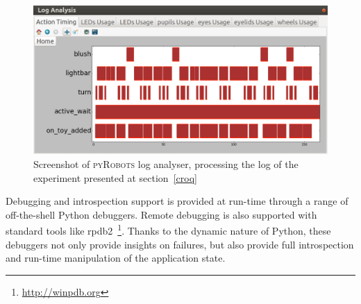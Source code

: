 \documentclass[a4paper, 10pt, conference]{ieeeconf}      %
\newcommand{\pyRobots}{\textsc{pyRobots}}
\begin{document}
\begin{figure}
        \centering
        \includegraphics[width=0.8\columnwidth]{log}
        \caption{Screenshot of \pyRobots{} log analyser, processing the log of the
        experiment presented at section~\ref{croq}}
        \label{log_view}
\end{figure}

Debugging and introspection support is provided at run-time through a range of
off-the-shell Python debuggers. Remote debugging is also supported with standard
tools like {\sc rpdb2}~\footnote{\url{http://winpdb.org}}. Thanks to the dynamic
nature of Python, these debuggers not only provide insights on failures, but
also provide full introspection and run-time manipulation of the application
state.
\end{document}
